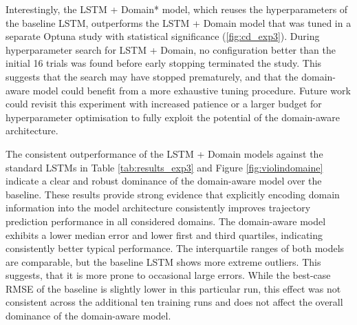          Interestingly, the LSTM + Domain* model, which reuses the hyperparameters of the baseline LSTM, outperforms the LSTM + Domain model that was tuned in a separate Optuna study with statistical significance (\ref{fig:cd_exp3}). During hyperparameter search for LSTM + Domain, no configuration better than the initial 16 trials was found before early stopping terminated the study. This suggests that the search may have stopped prematurely, and that the domain-aware model could benefit from a more exhaustive tuning procedure. Future work could revisit this experiment with increased patience or a larger budget for hyperparameter optimisation to fully exploit the potential of the domain-aware architecture.
        
        The consistent outperformance of the LSTM + Domain models  against the standard \acp{LSTM} in Table \ref{tab:results_exp3} and Figure \ref{fig:violindomaine} indicate a clear and robust dominance of the domain-aware model over the baseline.
        These results provide strong evidence that explicitly encoding domain information into the model architecture consistently improves trajectory prediction performance in all considered domains. 
        The domain-aware model exhibits a lower median error and lower first and third quartiles, indicating consistently better typical performance. The interquartile ranges of both models are comparable, but the baseline LSTM shows more extreme outliers. This suggests, that it is more prone to occasional large errors. While the best-case \acs{RMSE} of the baseline is slightly lower in this particular run, this effect was not consistent across the additional ten training runs and does not affect the overall dominance of the domain-aware model.
        

        


